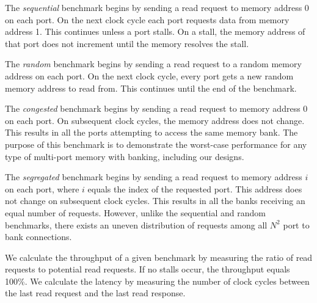     The {\em sequential} benchmark begins by sending a read request to memory address 0 on each port. On the next clock cycle each port requests data from memory address 1. This continues unless a port stalls. On a stall, the memory address of that port does not increment until the memory resolves the stall.

    The {\em random} benchmark begins by sending a read request to a random memory address on each port. On the next clock cycle, every port gets a new random memory address to read from. This continues until the end of the benchmark.

    The {\em congested} benchmark begins by sending a read request to memory address 0 on each port. On  subsequent clock cycles, the memory address does not change. This results in all the ports attempting to access the same memory bank. The purpose of this benchmark is to demonstrate the worst-case performance for any type of multi-port memory with banking, including our designs.

    The {\em segregated} benchmark begins by sending a read request to memory address $i$ on each port, where $i$ equals the index of the requested port. This address does not change on subsequent clock cycles. This results in all the banks receiving an equal number of requests. However, unlike the sequential and random benchmarks, there exists an uneven distribution of requests among all $N^2$ port to bank connections.

    We calculate the throughput of a given benchmark by measuring the ratio of read requests to potential read requests. If no stalls occur, the throughput equals 100\%. We calculate the latency by measuring the number of clock cycles between the last read request and the last read response. 

